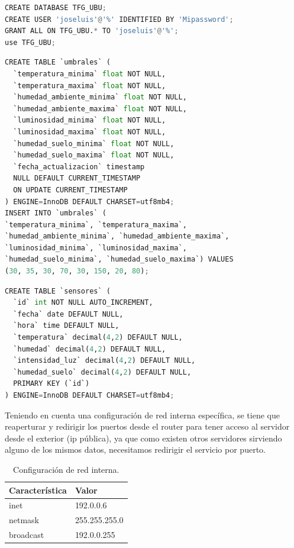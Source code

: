 \begin{lstlisting}[language=python, firstnumber=0, basicstyle=\normalsize, caption={Comandos Mysql para crear Database \textbf{TFG\_UBU}.}] 
CREATE DATABASE TFG_UBU;
CREATE USER 'joseluis'@'%' IDENTIFIED BY 'Mipassword';
GRANT ALL ON TFG_UBU.* TO 'joseluis'@'%';
use TFG_UBU;
\end{lstlisting}


\begin{lstlisting}[language=python, firstnumber=0, basicstyle=\normalsize, caption={Comandos Mysql para crear tabla \textbf{umbrales}.}] 
CREATE TABLE `umbrales` (
  `temperatura_minima` float NOT NULL,
  `temperatura_maxima` float NOT NULL,
  `humedad_ambiente_minima` float NOT NULL,
  `humedad_ambiente_maxima` float NOT NULL,
  `luminosidad_minima` float NOT NULL,
  `luminosidad_maxima` float NOT NULL,
  `humedad_suelo_minima` float NOT NULL,
  `humedad_suelo_maxima` float NOT NULL,
  `fecha_actualizacion` timestamp 
  NULL DEFAULT CURRENT_TIMESTAMP 
  ON UPDATE CURRENT_TIMESTAMP
) ENGINE=InnoDB DEFAULT CHARSET=utf8mb4;
INSERT INTO `umbrales` (
`temperatura_minima`, `temperatura_maxima`, 
`humedad_ambiente_minima`, `humedad_ambiente_maxima`, 
`luminosidad_minima`, `luminosidad_maxima`, 
`humedad_suelo_minima`, `humedad_suelo_maxima`) VALUES
(30, 35, 30, 70, 30, 150, 20, 80);
\end{lstlisting}

\begin{lstlisting}[language=python, firstnumber=0, basicstyle=\normalsize, caption={Comandos Mysql para crear tabla \textbf{sensores}.}] 
CREATE TABLE `sensores` (
  `id` int NOT NULL AUTO_INCREMENT,
  `fecha` date DEFAULT NULL,
  `hora` time DEFAULT NULL,
  `temperatura` decimal(4,2) DEFAULT NULL,
  `humedad` decimal(4,2) DEFAULT NULL,
  `intensidad_luz` decimal(4,2) DEFAULT NULL,
  `humedad_suelo` decimal(4,2) DEFAULT NULL,
  PRIMARY KEY (`id`)
) ENGINE=InnoDB DEFAULT CHARSET=utf8mb4;
\end{lstlisting}

Teniendo en cuenta una configuración de red interna específica, se tiene que reaperturar y redirigir los puertos desde el router para tener acceso al servidor desde el exterior (ip pública), ya que como existen otros servidores sirviendo alguno de los mismos datos, necesitamos redirigir el servicio por puerto.

\begin{table}[htbp]
\begin{center}
\caption{Configuración de red interna.}
\begin{tabular}{|l|l|} %
\hline
\rowcolor[HTML]{C0C0C0} 
\textbf{Característica} & \textbf{Valor}\\ \hline
inet & 192.0.0.6 \\ \hline
netmask & 255.255.255.0\\ \hline
broadcast & 192.0.0.255 \\ \hline
\end{tabular}
\end{center}
\end{table}

